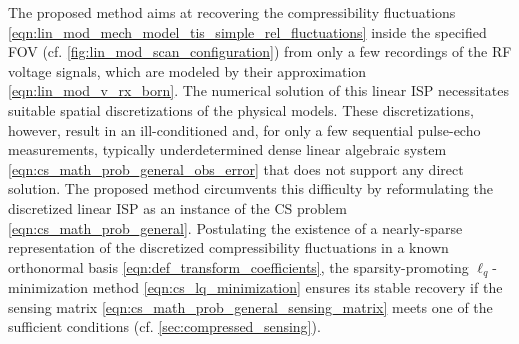 The proposed method aims at
recovering
the compressibility fluctuations
\eqref{eqn:lin_mod_mech_model_tis_simple_rel_fluctuations} inside
the specified \ac{FOV}
(cf. \cref{fig:lin_mod_scan_configuration}) from
only a few recordings of
the \ac{RF} voltage signals, which are modeled by
their  approximation
\eqref{eqn:lin_mod_v_rx_born}.
The numerical solution of
this linear \ac{ISP} necessitates
suitable spatial discretizations of
the physical models.
These discretizations, however, result in
an ill-conditioned and, for
only a few sequential pulse-echo measurements,
typically underdetermined dense linear algebraic system
\eqref{eqn:cs_math_prob_general_obs_error} that does not support
any direct solution.
The proposed method circumvents
this difficulty by reformulating
the discretized linear \ac{ISP} as
an instance of
the \ac{CS} problem
\eqref{eqn:cs_math_prob_general}.
Postulating
the existence of
a nearly-sparse representation of
the discretized compressibility fluctuations in
a known orthonormal basis
\eqref{eqn:def_transform_coefficients},
the sparsity-promoting $\ell_{q}$-minimization method
\eqref{eqn:cs_lq_minimization} ensures
its stable recovery if
the sensing matrix
\eqref{eqn:cs_math_prob_general_sensing_matrix} meets
one of
the sufficient conditions
(cf. \cref{sec:compressed_sensing}).

